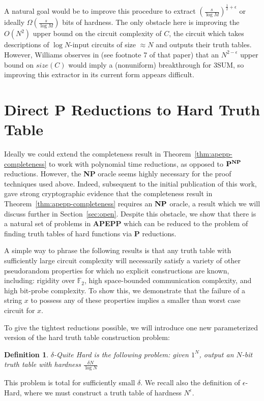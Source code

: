 \documentclass[11pt]{article}
\newtheorem{definition}{Definition}
\def\cl{\bf}
\begin{document}
A natural goal would be to improve this procedure to extract $(\frac{s}{\log M})^{\frac{1}{2} + \epsilon}$ or ideally $\Omega(\frac{s}{\log M})$ bits of hardness. The only obstacle here is improving the $O(N^2)$ upper bound on the circuit complexity of $C$, the circuit which takes descriptions of $\log N$-input circuits of size $\approx N$ and outputs their truth tables. However, Williams observes in \cite{sat-lb} (see footnote 7 of that paper) that an $N^{2 - \epsilon}$ upper bound on $size(C)$ would imply a (nonuniform) breakthrough for {\sc 3SUM}, so improving this extractor in its current form appears difficult.

\section{Direct {\cl P} Reductions to {\sc Hard Truth Table}}\label{sec:direct-reductions}
Ideally we could extend the completeness result in Theorem~\ref{thm:apepp-completeness} to work with polynomial time reductions, as opposed to ${\cl P}^{\cl NP}$ reductions. However, the {\cl NP} oracle seems highly necessary for the proof techniques used above. Indeed, subsequent to the initial publication of this work, \cite{ILW} gave strong cryptographic evidence that the completeness result in Theorem~\ref{thm:apepp-completeness} requires an ${\cl NP}$ oracle, a result which we will discuss further in Section~\ref{sec:open}. Despite this obstacle, we show that there is a natural set of problems in {\cl APEPP} which can be reduced to the problem of finding truth tables of hard functions via {\cl P} reductions. 

A simple way to phrase the following results is that any truth table with sufficiently large circuit complexity will necessarily satisfy a variety of other pseudorandom properties for which no explicit constructions are known, including: rigidity over $\mathbb{F}_2$, high space-bounded communication complexity, and high bit-probe complexity. To show this, we demonstrate that the failure of a string $x$ to possess any of these properties implies a smaller than worst case circuit for $x$. 

To give the tightest reductions possible, we will introduce one new parameterized version of the hard truth table construction problem:

\begin{definition}
{\sc $\delta$-Quite Hard} is the following problem: given $1^N$, output an $N$-bit truth table with hardness $\frac{\delta N}{\log N}$
\end{definition}
This problem is total for sufficiently small $\delta$. We recall also the definition of {\sc $\epsilon$-Hard}, where we must construct a truth table of hardness $N^{\epsilon}$.
\end{document}
